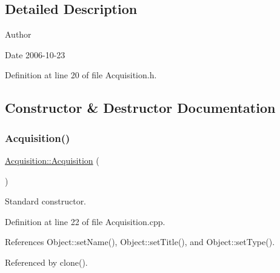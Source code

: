 \subsection{Detailed Description}
\begin{DoxyAuthor}{Author}

\end{DoxyAuthor}
\begin{DoxyDate}{Date}
2006-\/10-\/23 
\end{DoxyDate}


Definition at line 20 of file Acquisition.\+h.



\subsection{Constructor \& Destructor Documentation}
\mbox{\label{classAcquisition_aa7d3138495a4a8888c21b33f4d657732}} 
\subsubsection{\texorpdfstring{Acquisition()}{Acquisition()}\hspace{0.1cm}{\footnotesize\ttfamily [1/2]}}
{\footnotesize\ttfamily \hyperlink{classAcquisition_1_1Acquisition}{Acquisition\+::\+Acquisition} (\begin{DoxyParamCaption}{ }\end{DoxyParamCaption})}



Standard constructor. 



Definition at line 22 of file Acquisition.\+cpp.



References Object\+::set\+Name(), Object\+::set\+Title(), and Object\+::set\+Type().



Referenced by clone().


